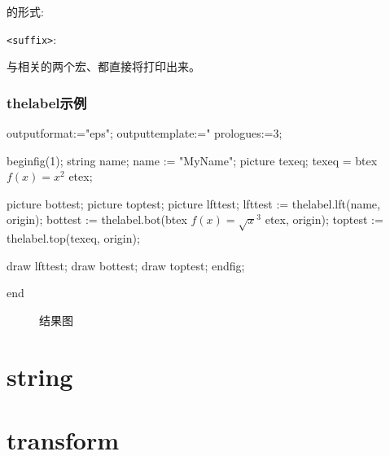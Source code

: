 的形式:\newline
\indent {}\par

\noindent\lstinline$<suffix>$:

与相关的两个宏、都直接将打印出来。

\subsubsection{thelabel示例}

\begin{mpostcode}
outputformat:="eps";
outputtemplate:="%
prologues:=3;

beginfig(1);
    string name;
    name := "MyName";
    picture texeq;
    texeq = btex $f(x) = x^2$ etex;

    picture bottest;
    picture toptest;
    picture lfttest;
    lfttest := thelabel.lft(name, origin);
    bottest := thelabel.bot(btex $f(x) = {\sqrt{x}}^3$ etex, origin);
    toptest := thelabel.top(texeq, origin);

    draw lfttest;
    draw bottest;
    draw toptest;
endfig;

end
\end{mpostcode}

\begin{figure}[H]
    \caption{结果图}
    \label{fig:thelabel}
    \centering
\end{figure}

\section{string}
\label{sec:string}


\section{transform}
\label{sec:transform}

